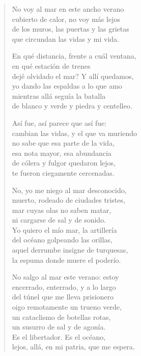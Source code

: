 \documentclass[12pt]{article}
\begin{document}
\clearpage
{}
\begin{verse}

No voy al mar en este ancho verano\\
cubierto de calor, no voy más lejos\\
de los muros, las puertas y las grietas\\
que circundan las vidas y mi vida.  

En qué distancia, frente a cuál ventana,\\
en qué estación de trenes\\
dejé olvidado el mar? Y allí quedamos,\\
yo dando las espaldas a lo que amo\\
mientras allá seguía la batalla\\
de blanco y verde y piedra y centelleo.  

Así fue, así parece que así fue:\\
cambian las vidas, y el que va muriendo\\
no sabe que esa parte de la vida,\\
esa nota mayor, esa abundancia\\
de cólera y fulgor quedaron lejos,\\
te fueron ciegamente cercenadas.  

No, yo me niego al mar desconocido,\\
muerto, rodeado de ciudades tristes,\\
mar cuyas olas no saben matar,\\
ni cargarse de sal y de sonido.\\
Yo quiero el mío mar, la artillería\\
del océano golpeando las orillas,\\
aquel derrumbe insigne de turquesas,\\
la espuma donde muere el poderío.  

No salgo al mar este verano: estoy\\
encerrado, enterrado, y a lo largo\\
del túnel que me lleva prisionero\\
oigo remotamente un trueno verde,\\
un cataclismo de botellas rotas,\\
un susurro de sal y de agonía.\\
Es el libertador. Es el océano,\\
lejos, allá, en mi patria, que me espera.  

\end{verse}
\end{document}
